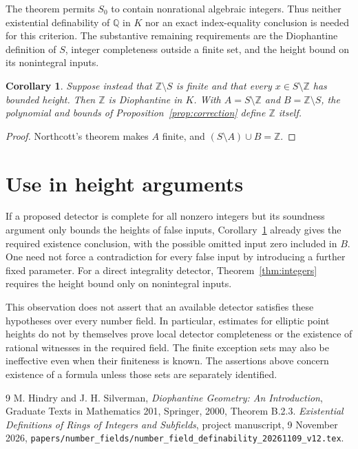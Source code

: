 \documentclass[11pt,a4paper]{article}
\newtheorem{corollary}[theorem]{Corollary}
\newcommand{\Z}{\mathbb Z}\newcommand{\Q}{\mathbb Q}
\begin{document}
The theorem permits $S_0$ to contain nonrational algebraic
integers. Thus neither existential definability of $\Q$ in $K$
nor an exact index-equality conclusion is needed for this
criterion. The substantive remaining requirements are the
Diophantine definition of $S$, integer completeness outside a
finite set, and the height bound on its nonintegral inputs.

\begin{corollary}\label{cor:rationalintegers}
Suppose instead that $\Z\setminus S$ is finite and that every
$x\in S\setminus\Z$ has bounded height. Then $\Z$ is
Diophantine in $K$. With
$A=S\setminus\Z$ and $B=\Z\setminus S$, the polynomial and
bounds of Proposition~\ref{prop:correction} define $\Z$ itself.
\end{corollary}
\begin{proof}
Northcott's theorem makes $A$ finite, and
$(S\setminus A)\cup B=\Z$.
\end{proof}

\section{Use in height arguments}

If a proposed detector is complete for all nonzero integers but
its soundness argument only bounds the heights of false inputs,
Corollary~\ref{cor:rationalintegers} already gives the required
existence conclusion, with the possible omitted input zero
included in $B$. One need not force a contradiction for every
false input by introducing a further fixed parameter.
For a direct integrality detector, Theorem~\ref{thm:integers}
requires the height bound only on nonintegral inputs.

This observation does not assert that an available detector
satisfies these hypotheses over every number field. In
particular, estimates for elliptic point heights do not by
themselves prove local detector completeness or the existence
of rational witnesses in the required field. The finite
exception sets may also be ineffective even when their
finiteness is known. The assertions above concern existence of
a formula unless those sets are separately identified.

\begin{thebibliography}{9}
M. Hindry and J. H. Silverman,
\emph{Diophantine Geometry: An Introduction},
Graduate Texts in Mathematics 201, Springer, 2000,
Theorem B.2.3.
\emph{Existential Definitions of Rings of Integers and Subfields},
project manuscript, 9 November 2026,
\nolinkurl{papers/number_fields/number_field_definability_20261109_v12.tex}.
\end{thebibliography}
\end{document}
